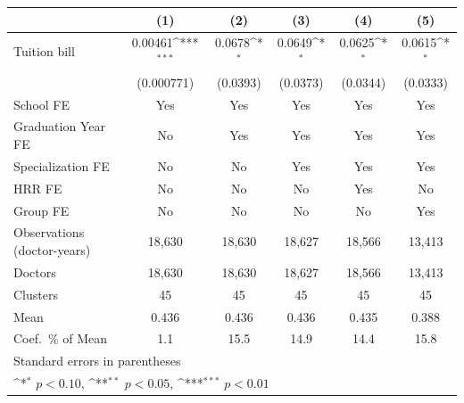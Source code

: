 {
\def\sym#1{\ifmmode^{#1}\else\(^{#1}\)\fi}
\begin{tabular}{l*{5}{c}}
\hline\hline
                    &\multicolumn{1}{c}{(1)}         &\multicolumn{1}{c}{(2)}         &\multicolumn{1}{c}{(3)}         &\multicolumn{1}{c}{(4)}         &\multicolumn{1}{c}{(5)}         \\
\hline
Tuition bill        &     0.00461\sym{***}&      0.0678\sym{*}  &      0.0649\sym{*}  &      0.0625\sym{*}  &      0.0615\sym{*}  \\
                    &  (0.000771)         &    (0.0393)         &    (0.0373)         &    (0.0344)         &    (0.0333)         \\
[1em]
School FE           &         Yes         &         Yes         &         Yes         &         Yes         &         Yes         \\
[1em]
Graduation Year FE  &          No         &         Yes         &         Yes         &         Yes         &         Yes         \\
[1em]
Specialization FE   &          No         &          No         &         Yes         &         Yes         &         Yes         \\
[1em]
HRR FE              &          No         &          No         &          No         &         Yes         &          No         \\
[1em]
Group FE            &          No         &          No         &          No         &          No         &         Yes         \\
\hline
Observations (doctor-years)&      18,630         &      18,630         &      18,627         &      18,566         &      13,413         \\
Doctors             &      18,630         &      18,630         &      18,627         &      18,566         &      13,413         \\
Clusters            &          45         &          45         &          45         &          45         &          45         \\
Mean                &       0.436         &       0.436         &       0.436         &       0.435         &       0.388         \\
Coef.\ \% of Mean   &         1.1         &        15.5         &        14.9         &        14.4         &        15.8         \\
\hline\hline
\multicolumn{6}{l}{\footnotesize Standard errors in parentheses}\\
\multicolumn{6}{l}{\footnotesize \sym{*} \(p<0.10\), \sym{**} \(p<0.05\), \sym{***} \(p<0.01\)}\\
\end{tabular}
}
